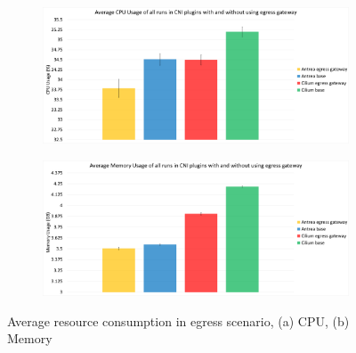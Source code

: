 \begin{figure}[H]
    \centering
    \begin{subfigure}[b]{1\textwidth}
        \includegraphics[width=\textwidth]{plots/egress/cpu_total_average.png}
        \caption{}
        \label{fig:cpu_avg}
    \end{subfigure}
    \begin{subfigure}[b]{1\textwidth}
        \includegraphics[width=\textwidth]{plots/egress/memory_total_average.png}
        \caption{}
        \label{fig:memory_avg}
    \end{subfigure}
    
    \caption{Average resource consumption in egress scenario, (a) CPU, (b) Memory}
    \label{fig:res_avg}
\end{figure}


